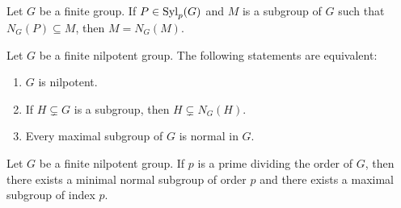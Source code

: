 \begin{exercise}
	\label{xca:truco}
	Let $G$ be a finite group. If $P\in\mathrm{Syl}_p(G)$ and $M$ is a subgroup of $G$ such that 
	$N_G(P)\subseteq M$, then $M=N_G(M)$. 
\end{exercise}


\begin{exercise}
	\label{xca:normalizadora}
	Let $G$ be a finite nilpotent group. The following statements are equivalent:  
	\begin{enumerate}
		\item $G$ is nilpotent.
		\item If $H\subsetneq G$ is a subgroup, then $H\subsetneq N_G(H)$.
		\item Every maximal subgroup of $G$ is normal in $G$.
	\end{enumerate}
\end{exercise}



\begin{exercise}
	Let $G$ be a finite nilpotent group. If $p$ is a prime dividing the order of $G$, then there
	exists a minimal normal subgroup of order $p$ and there exists a maximal subgroup of index $p$.
\end{exercise}

